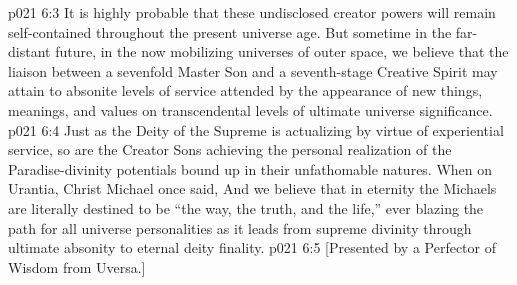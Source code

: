 \vs p021 6:3 It is highly probable that these undisclosed creator powers will remain self\hyp{}contained throughout the present universe age. But sometime in the far\hyp{}distant future, in the now mobilizing universes of outer space, we believe that the liaison between a sevenfold Master Son and a seventh\hyp{}stage Creative Spirit may attain to absonite levels of service attended by the appearance of new things, meanings, and values on transcendental levels of ultimate universe significance.
\vs p021 6:4 Just as the Deity of the Supreme is actualizing by virtue of experiential service, so are the Creator Sons achieving the personal realization of the Paradise\hyp{}divinity potentials bound up in their unfathomable natures. When on Urantia, Christ Michael once said,  And we believe that in eternity the Michaels are literally destined to be “the way, the truth, and the life,” ever blazing the path for all universe personalities as it leads from supreme divinity through ultimate absonity to eternal deity finality.
\vsetoff
\vs p021 6:5 [Presented by a Perfector of Wisdom from Uversa.]
\quizlink
